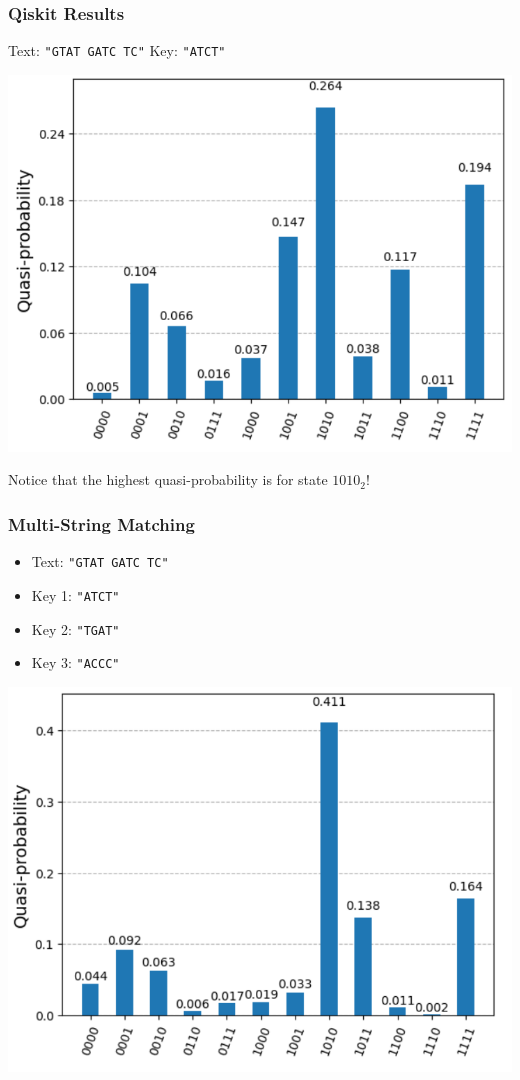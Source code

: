 \documentclass[
	11pt, %
]{beamer}
\begin{document}
\begin{frame}
    \frametitle{Qiskit Results}
    Text: \texttt{"GTAT GATC TC"}
    Key: \texttt{"ATCT"}

    \begin{center}
        \includegraphics[scale=0.5]{aer_search.png}
    \end{center}
    Notice that the highest quasi-probability is for state $1010_2$! 
\end{frame}


\begin{frame}
    \frametitle{Multi-String Matching}
    \begin{itemize}
        \item Text: \texttt{"GTAT GATC TC"}
        \item Key 1: \texttt{"ATCT"}
        \item Key 2: \texttt{"TGAT"}
        \item Key 3: \texttt{"ACCC"}
    \end{itemize}

    \begin{center}
        \includegraphics[scale=0.5]{aer_multi_string_match.png}
    \end{center}
\end{frame}
\end{document}
